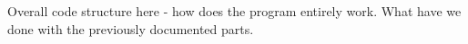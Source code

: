 \documentclass[../report.tex]{subfiles}
\begin{document}
Overall code structure here - how does the program entirely work. What have we done with the 
previously documented parts.
\end{document}
